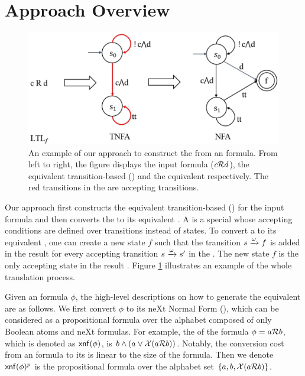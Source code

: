 \section{Approach Overview}\label{sec:overview}

\begin{figure}
\centering
  \includegraphics[scale=0.4]{overview.pdf}
  \caption{An example of our approach to construct the \NFA from an \ltlf formula. From left to right, the figure displays the input formula ($c\mathcal{R} d$), the equivalent transition-based \NFA (\TNFA) and the equivalent \NFA respectively. The red transitions in the \TNFA are accepting transitions.}
  \label{fig:overview}
\end{figure}

Our approach first constructs the equivalent transition-based \NFA (\TNFA) for the input formula and then converts the \TNFA to its equivalent \NFA. A \TNFA is a special \NFA whose accepting conditions are defined over transitions instead of states. To convert a \TNFA to its equivalent \NFA, one can create a new state $f$ such that the transition $s\xrightarrow[]{\omega}f$ is added in the result \NFA for every accepting transition $s\xrightarrow[]{\omega}s'$ in the \TNFA. The new state $f$ is the only accepting state in the result \NFA. Figure \ref{fig:overview} illustrates an example of the whole translation process. 

Given an \ltlf formula $\phi$, the high-level descriptions on how to generate the equivalent \TNFA are as follows. We first convert $\phi$ to its neXt Normal Form (\XNF), which can be considered as a propositional formula over the alphabet composed of only Boolean atoms and neXt formulas. For example, the \XNF of the formula $\phi=a\mathcal{R} b$, which is denoted as ${\sf xnf}(\phi)$, is $b\wedge (a\vee \mathcal{X}(a\mathcal{R} b))$. Notably, the conversion cost from an \ltlf formula to its \XNF is linear to the size of the formula. Then we denote ${\sf xnf}(\phi)^p$ is the propositional formula over the alphabet set $\{a, b, \mathcal{X}(a\mathcal{R} b)\}$.

